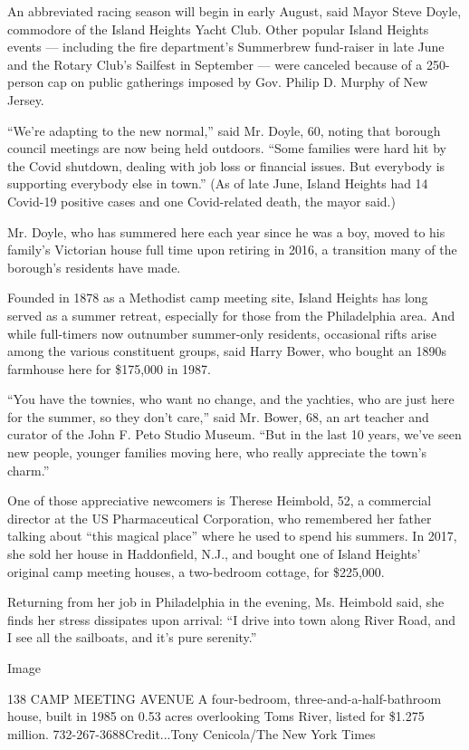 An abbreviated racing season will begin in early August, said Mayor
Steve Doyle, commodore of the Island Heights Yacht Club. Other popular
Island Heights events --- including the fire department's Summerbrew
fund-raiser in late June and the Rotary Club's Sailfest in September ---
were canceled because of a 250-person cap on public gatherings imposed
by Gov. Philip D. Murphy of New Jersey.

``We're adapting to the new normal,'' said Mr. Doyle, 60, noting that
borough council meetings are now being held outdoors. ``Some families
were hard hit by the Covid shutdown, dealing with job loss or financial
issues. But everybody is supporting everybody else in town.'' (As of
late June, Island Heights had 14 Covid-19 positive cases and one
Covid-related death, the mayor said.)

Mr. Doyle, who has summered here each year since he was a boy, moved to
his family's Victorian house full time upon retiring in 2016, a
transition many of the borough's residents have made.

Founded in 1878 as a Methodist camp meeting site, Island Heights has
long served as a summer retreat, especially for those from the
Philadelphia area. And while full-timers now outnumber summer-only
residents, occasional rifts arise among the various constituent groups,
said Harry Bower, who bought an 1890s farmhouse here for \$175,000 in
1987.

``You have the townies, who want no change, and the yachties, who are
just here for the summer, so they don't care,'' said Mr. Bower, 68, an
art teacher and curator of the John F. Peto Studio Museum. ``But in the
last 10 years, we've seen new people, younger families moving here, who
really appreciate the town's charm.''

One of those appreciative newcomers is Therese Heimbold, 52, a
commercial director at the US Pharmaceutical Corporation, who remembered
her father talking about ``this magical place'' where he used to spend
his summers. In 2017, she sold her house in Haddonfield, N.J., and
bought one of Island Heights' original camp meeting houses, a
two-bedroom cottage, for \$225,000.

Returning from her job in Philadelphia in the evening, Ms. Heimbold
said, she finds her stress dissipates upon arrival: ``I drive into town
along River Road, and I see all the sailboats, and it's pure serenity.''

Image

138 CAMP MEETING AVENUE \textbar{} A four-bedroom,
three-and-a-half-bathroom house, built in 1985 on 0.53 acres overlooking
Toms River, listed for \$1.275 million. 732-267-3688Credit...Tony
Cenicola/The New York Times

